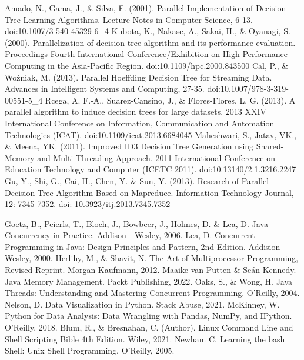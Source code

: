 \documentclass[12pt]{article}
\begin{document}
\begin{thebibliography}{20}
     Amado, N., Gama, J., \& Silva, F. (2001). Parallel Implementation of Decision Tree Learning Algorithms. Lecture Notes in Computer Science, 6-13. doi:10.1007/3-540-45329-6\_4 
     Kubota, K., Nakase, A., Sakai, H., \& Oyanagi, S. (2000). Parallelization of decision tree algorithm and its performance evaluation. Proceedings Fourth International Conference/Exhibition on High Performance Computing in the Asia-Pacific Region. doi:10.1109/hpc.2000.843500
     Cal, P., \& Woźniak, M. (2013). Parallel Hoeffding Decision Tree for Streaming Data. Advances in Intelligent Systems and Computing, 27-35. doi:10.1007/978-3-319-00551-5\_4
     Rcega, A. F.-A., Suarez-Cansino, J., \& Flores-Flores, L. G. (2013). A parallel algorithm to induce decision trees for large datasets. 2013 XXIV International Conference on Information, Communication and Automation Technologies (ICAT). doi:10.1109/icat.2013.6684045 
     Maheshwari, S., Jatav, VK., \& Meena, YK. (2011). Improved ID3 Decision Tree Generation using Shared-Memory and Multi-Threading Approach. 2011 International Conference on Education Technology and Computer (ICETC 2011). doi:10.13140/2.1.3216.2247
     Gu, Y., Shi, G., Cai, H., Chen, Y. \& Sun, Y. (2013). Research of Parallel Decision Tree Algorithm Based on Mapreduce. Information Technology Journal, 12: 7345-7352. doi: 10.3923/itj.2013.7345.7352
    
     Goetz, B., Peierls, T., Bloch, J., Bowbeer, J., Holmes, D. \& Lea, D. Java Concurrency in Practice. Addison - Wesley, 2006.
     Lea, D. Concurrent Programming in Java: Design Principles and Pattern, 2nd Edition. Addision-Wesley, 2000.
     Herlihy, M., \& Shavit, N. The Art of Multiprocessor Programming, Revised Reprint. Morgan Kaufmann, 2012.
     Maaike van Putten \& Seán Kennedy. Java Memory Management. Packt Publishing, 2022.
     Oaks, S., \& Wong, H. Java Threads: Understanding and Mastering Concurrent Programming. O'Reilly, 2004.
     Nelson, D. Data Visualization in Python. Stack Abuse, 2021.
     McKinney, W. Python for Data Analysis: Data Wrangling with Pandas, NumPy, and IPython. O'Reilly, 2018.
     Blum, R., \& Bresnahan, C. (Author). Linux Command Line and Shell Scripting Bible 4th Edition. Wiley, 2021.
     Newham C. Learning the bash Shell: Unix Shell Programming. O'Reilly, 2005.

\end{thebibliography}
\end{document}
